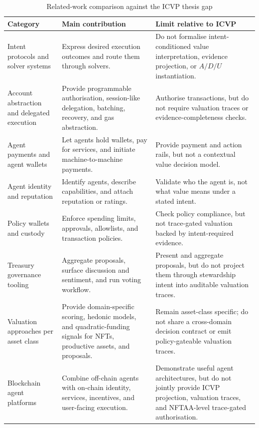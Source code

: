 \begin{table}[!htb]
	\centering
	\caption{Related-work comparison against the ICVP thesis gap}
	\label{tab:related-work-icvp}
	\scriptsize
	\begin{tabular}{|p{3.0cm}|p{4.6cm}|p{5.7cm}|}
		\hline
		\textbf{Category} & \textbf{Main contribution} & \textbf{Limit relative to ICVP} \\
		\hline
		Intent protocols and solver systems & Express desired execution outcomes and route them through solvers. & Do not formalise intent-conditioned value interpretation, evidence projection, or $A/D/U$ instantiation. \\
		\hline
		Account abstraction and delegated execution & Provide programmable authorisation, session-like delegation, batching, recovery, and gas abstraction. & Authorise transactions, but do not require valuation traces or evidence-completeness checks. \\
		\hline
		Agent payments and agent wallets & Let agents hold wallets, pay for services, and initiate machine-to-machine payments. & Provide payment and action rails, but not a contextual value decision model. \\
		\hline
		Agent identity and reputation & Identify agents, describe capabilities, and attach reputation or ratings. & Validate who the agent is, not what value means under a stated intent. \\
		\hline
		Policy wallets and custody & Enforce spending limits, approvals, allowlists, and transaction policies. & Check policy compliance, but not trace-gated valuation backed by intent-required evidence. \\
		\hline
		Treasury governance tooling & Aggregate proposals, surface discussion and sentiment, and run voting workflow. & Present and aggregate proposals, but do not project them through stewardship intent into auditable valuation traces. \\
		\hline
		Valuation approaches per asset class & Provide domain-specific scoring, hedonic models, and quadratic-funding signals for NFTs, productive assets, and proposals. & Remain asset-class specific; do not share a cross-domain decision contract or emit policy-gateable valuation traces. \\
		\hline
		Blockchain agent platforms & Combine off-chain agents with on-chain identity, services, incentives, and user-facing execution. & Demonstrate useful agent architectures, but do not jointly provide ICVP projection, valuation traces, and NFTAA-level trace-gated authorisation. \\
		\hline
	\end{tabular}
\end{table}

